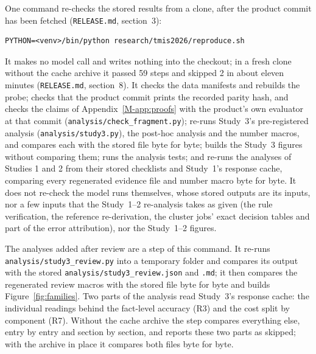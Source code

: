 One command re-checks the stored results from a clone, after the product commit has been fetched (\texttt{RELEASE.md}, section~3):
\begin{lstlisting}
PYTHON=<venv>/bin/python research/tmis2026/reproduce.sh
\end{lstlisting}
It makes no model call and writes nothing into the checkout; in a fresh clone without the cache archive it passed 59 steps and skipped 2 in about eleven minutes (\texttt{RELEASE.md}, section~8). It checks the data manifests and rebuilds the probe; checks that the product commit prints the recorded parity hash, and checks the claims of Appendix~\ref{M-app:proofs} with the product's own evaluator at that commit (\texttt{analysis/\allowbreak{}check\_fragment.py}); re-runs Study~3's pre-registered analysis (\texttt{analysis/\allowbreak{}study3.py}), the post-hoc analysis and the number macros, and compares each with the stored file byte for byte; builds the Study~3 figures without comparing them; runs the analysis tests; and re-runs the analyses of Studies 1 and 2 from their stored checklists and Study~1's response cache, comparing every regenerated evidence file and number macro byte for byte. It does not re-check the model runs themselves, whose stored outputs are its inputs, nor a few inputs that the Study~1--2 re-analysis takes as given (the rule verification, the reference re-derivation, the cluster jobs' exact decision tables and part of the error attribution), nor the Study~1--2 figures.

The analyses added after review are a step of this command. It re-runs \texttt{analysis/\allowbreak{}study3\_\allowbreak{}review.py} into a temporary folder and compares its output with the stored \texttt{analysis/\allowbreak{}study3\_\allowbreak{}review.json} and \texttt{.md}; it then compares the regenerated review macros with the stored file byte for byte and builds Figure~\ref{fig:families}. Two parts of the analysis read Study~3's response cache: the individual readings behind the fact-level accuracy (R3) and the cost split by component (R7). Without the cache archive the step compares everything else, entry by entry and section by section, and reports these two parts as skipped; with the archive in place it compares both files byte for byte.

